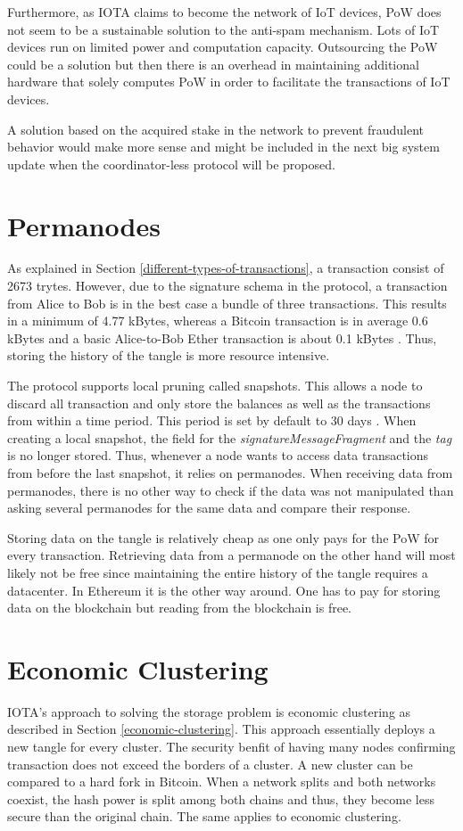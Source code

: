 Furthermore, as IOTA claims to become the network of IoT devices, PoW does not seem to be a sustainable solution to the anti-spam mechanism. Lots of IoT devices run on limited power and computation capacity. Outsourcing the PoW could be a solution but then there is an overhead in maintaining additional hardware that solely computes PoW in order to facilitate the transactions of IoT devices.


A solution based on the acquired stake in the network to prevent fraudulent behavior would make more sense and might be included in the next big system update when the coordinator-less protocol will be proposed.

\section{Permanodes}
As explained in Section \ref{different-types-of-transactions}, a transaction consist of 2673 trytes. However, due to the signature schema in the protocol, a transaction from Alice to Bob is in the best case a bundle of three transactions. This results in a minimum of 4.77 kBytes, whereas a Bitcoin transaction is in average 0.6 kBytes \cite{transaction-size} and a basic Alice-to-Bob Ether transaction is about 0.1 kBytes \cite{transaction-size-eth}. Thus, storing the history of the tangle is more resource intensive.

The protocol supports local pruning called snapshots. This allows a node to discard all transaction and only store the balances as well as the transactions from within a time period. This period is set by default to 30 days \cite{local-snapshots}. When creating a local snapshot, the field for the \textit{signatureMessageFragment} and the \textit{tag} is no longer stored. Thus, whenever a node wants to access data transactions from before the last snapshot, it relies on permanodes.
When receiving data from permanodes, there is no other way to check if the data was not manipulated than asking several permanodes for the same data and compare their response. 

Storing data on the tangle is relatively cheap as one only pays for the PoW for every transaction. Retrieving data from a permanode on the other hand will most likely not be free since maintaining the entire history of the tangle requires a datacenter. In Ethereum it is the other way around. One has to pay for storing data on the blockchain but reading from the blockchain is free.

\section{Economic Clustering}
IOTA's approach to solving the storage problem is economic clustering as described in Section \ref{economic-clustering}. This approach essentially deploys a new tangle for every cluster. The security benfit of having many nodes confirming transaction does not exceed the borders of a cluster. A new cluster can be compared to a hard fork in Bitcoin. When a network splits and both networks coexist, the hash power is split among both chains and thus, they become less secure than the original chain. The same applies to economic clustering. 